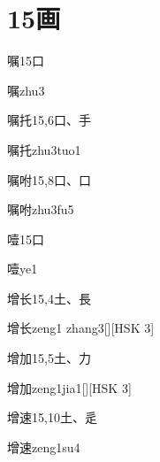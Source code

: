 
\section*{15画}

\begin{entry}{嘱}{15}{⼝}
  \begin{phonetics}{嘱}{zhu3}
  \end{phonetics}
\end{entry}

\begin{entry}{嘱托}{15,6}{⼝、⼿}
  \begin{phonetics}{嘱托}{zhu3tuo1}
  \end{phonetics}
\end{entry}

\begin{entry}{嘱咐}{15,8}{⼝、⼝}
  \begin{phonetics}{嘱咐}{zhu3fu5}
  \end{phonetics}
\end{entry}

\begin{entry}{噎}{15}{⼝}
  \begin{phonetics}{噎}{ye1}
  \end{phonetics}
\end{entry}

\begin{entry}{增长}{15,4}{⼟、⾧}
  \begin{phonetics}{增长}{zeng1 zhang3}[][HSK 3]
  \end{phonetics}
\end{entry}

\begin{entry}{增加}{15,5}{⼟、⼒}
  \begin{phonetics}{增加}{zeng1jia1}[][HSK 3]
  \end{phonetics}
\end{entry}

\begin{entry}{增速}{15,10}{⼟、⾡}
  \begin{phonetics}{增速}{zeng1su4}
  \end{phonetics}
\end{entry}


